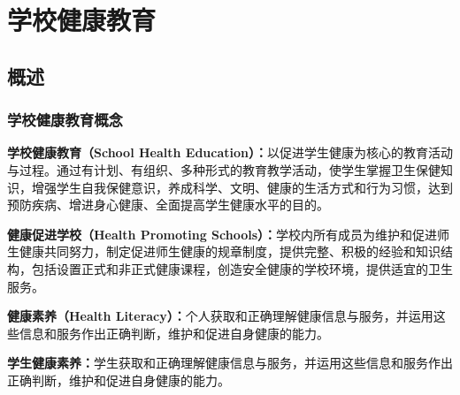 \chapter{学校健康教育}
\setcounter{chapter}{17}

\section{概述}

\subsection{学校健康教育概念}

\begin{keybox}
\textbf{学校健康教育（School Health Education）：}以促进学生健康为核心的教育活动与过程。通过有计划、有组织、多种形式的教育教学活动，使学生掌握卫生保健知识，增强学生自我保健意识，养成科学、文明、健康的生活方式和行为习惯，达到预防疾病、增进身心健康、全面提高学生健康水平的目的。
\end{keybox}

\begin{defbox}
\textbf{健康促进学校（Health Promoting Schools）：}学校内所有成员为维护和促进师生健康共同努力，制定促进师生健康的规章制度，提供完整、积极的经验和知识结构，包括设置正式和非正式健康课程，创造安全健康的学校环境，提供适宜的卫生服务。

\textbf{健康素养（Health Literacy）：}个人获取和正确理解健康信息与服务，并运用这些信息和服务作出正确判断，维护和促进自身健康的能力。

\textbf{学生健康素养：}学生获取和正确理解健康信息与服务，并运用这些信息和服务作出正确判断，维护和促进自身健康的能力。
\end{defbox}

